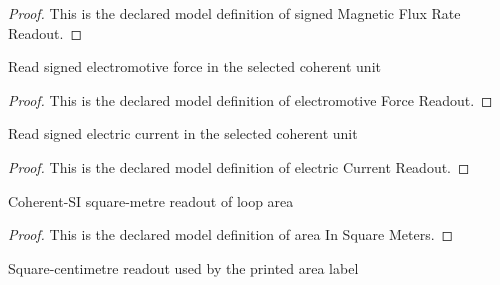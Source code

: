 \begin{proof}
  This is the declared model definition of signed Magnetic Flux Rate Readout.
\end{proof}
\begin{definition}
  \label{def:physics:phyx-mini-0935:phyxminiproblems-problemphyxmini0935-electromotiveforcereadout}
  Read signed electromotive force in the selected coherent unit
\end{definition}
\begin{proof}
  This is the declared model definition of electromotive Force Readout.
\end{proof}
\begin{definition}
  \label{def:physics:phyx-mini-0935:phyxminiproblems-problemphyxmini0935-electriccurrentreadout}
  Read signed electric current in the selected coherent unit
\end{definition}
\begin{proof}
  This is the declared model definition of electric Current Readout.
\end{proof}
\begin{definition}
  \label{def:physics:phyx-mini-0935:phyxminiproblems-problemphyxmini0935-areainsquaremeters}
  Coherent-SI square-metre readout of loop area
\end{definition}
\begin{proof}
  This is the declared model definition of area In Square Meters.
\end{proof}
\begin{definition}
  \label{def:physics:phyx-mini-0935:phyxminiproblems-problemphyxmini0935-areainsquarecentimeters}
  Square-centimetre readout used by the printed area label
\end{definition}
